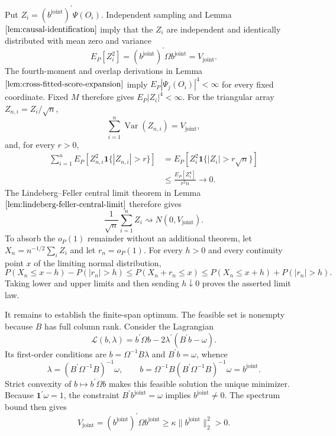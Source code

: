 Put \(Z_i=(b^{\mathrm{joint}})^{\prime}\Psi(O_i)\). Independent sampling and Lemma \(\ref{lem:causal-identification}\) imply that the \(Z_i\) are independent and identically distributed with mean zero and variance
\[
 E_P[Z_i^2]=(b^{\mathrm{joint}})^{\prime}\Omega b^{\mathrm{joint}}
 =V_{\mathrm{joint}}.
\]
The fourth-moment and overlap derivations in Lemma \(\ref{lem:cross-fitted-score-expansion}\) imply \(E_P|\Psi_j(O_i)|^4<\infty\) for every fixed coordinate. Fixed \(M\) therefore gives \(E_P|Z_i|^4<\infty\). For the triangular array \(Z_{n,i}=Z_i/\sqrt n\),
\[
 \sum_{i=1}^n\operatorname{Var}(Z_{n,i})=V_{\mathrm{joint}},
\]
and, for every \(r>0\),
\[
\begin{aligned}
 \sum_{i=1}^nE_P[Z_{n,i}^2\mathbf 1\{|Z_{n,i}|>r\}]
 &=E_P[Z_i^2\mathbf 1\{|Z_i|>r\sqrt n\}]\\
 &\le\frac{E_P[Z_i^4]}{r^2n}\longrightarrow0.
\end{aligned}
\]
The Lindeberg--Feller central limit theorem in Lemma \(\ref{lem:lindeberg-feller-central-limit}\) therefore gives
\[
 \frac1{\sqrt n}\sum_{i=1}^nZ_i\rightsquigarrow N(0,V_{\mathrm{joint}}).
\]
To absorb the \(o_P(1)\) remainder without an additional theorem, let \(X_n=n^{-1/2}\sum_iZ_i\) and let \(r_n=o_P(1)\). For every \(h>0\) and every continuity point \(x\) of the limiting normal distribution,
\[
 P(X_n\le x-h)-P(|r_n|>h)
 \le P(X_n+r_n\le x)
 \le P(X_n\le x+h)+P(|r_n|>h).
\]
Taking lower and upper limits and then sending \(h\downarrow0\) proves the asserted limit law.

It remains to establish the finite-span optimum. The feasible set is nonempty because \(B\) has full column rank. Consider the Lagrangian
\[
 \mathcal L(b,\lambda)=b^{\prime}\Omega b
 -2\lambda^{\prime}(B^{\prime}b-\omega).
\]
Its first-order conditions are \(b=\Omega^{-1}B\lambda\) and \(B^{\prime}b=\omega\), whence
\[
 \lambda=(B^{\prime}\Omega^{-1}B)^{-1}\omega,
 \qquad
 b=\Omega^{-1}B(B^{\prime}\Omega^{-1}B)^{-1}\omega
 =b^{\mathrm{joint}}.
\]
Strict convexity of \(b\mapsto b^{\prime}\Omega b\) makes this feasible solution the unique minimizer. Because \(\mathbf 1^{\prime}\omega=1\), the constraint \(B^{\prime}b^{\mathrm{joint}}=\omega\) implies \(b^{\mathrm{joint}}\ne0\). The spectrum bound then gives
\[
 V_{\mathrm{joint}}
 =(b^{\mathrm{joint}})^{\prime}\Omega b^{\mathrm{joint}}
 \ge\kappa\|b^{\mathrm{joint}}\|_2^2>0.
\]

